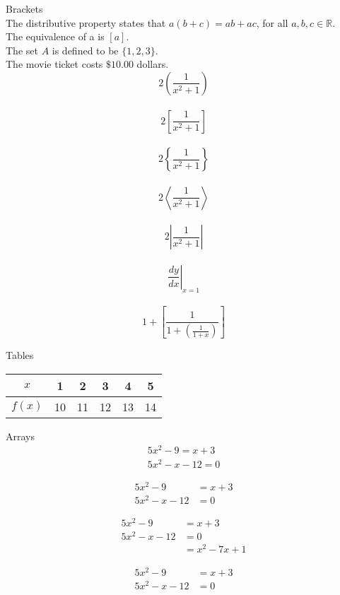 \documentclass[11pt]{article}
\begin{document}
Brackets \\[10pt]
The distributive property states that $a(b+c)=ab+ac$, 
for all $a, b, c \in \mathbb{R}$. \\[6pt]
The equivalence of a is $[a]$.\\[6pt]
The set $A$ is defined to be $\{1,2,3\}$.\\[6pt]
The movie ticket costs $\$10.00$ dollars. \\[6pt]

$$2\left(\frac{1}{x^2+1}\right)$$ \\[2pt]
$$2\left[\frac{1}{x^2+1}\right]$$ \\[2pt]
$$2\left\{\frac{1}{x^2+1}\right\}$$ \\[2pt]
$$2\left\langle  \frac{1}{x^2+1}\right\rangle  $$ \\[2pt]
$$2\left|  \frac{1}{x^2+1}\right|  $$ \\[2pt]
$$\left.\frac{dy}{dx}\right|_{x=1}$$ \\[2pt]
$$1+\left[\frac{1}{1+\left(\frac{1}{1+x}\right)}\right]$$

Tables \\[10pt]
\begin{tabular}{|c|c|c|c|c|c|}
\hline
$x$ &1 &2 &3 &4 &5 \\ \hline
$f(x)$ &10 &11 &12 &13 &14 \\ \hline
\end{tabular}

Arrays
\begin{align}
5x^2-9 = x+3\\
5x^2-x-12 = 0
\end{align}

\begin{align}
5x^2-9 &= x+3\\
5x^2-x-12 &= 0
\end{align}

\begin{align*}
5x^2-9 &= x+3\\
5x^2-x-12 &= 0\\
&= x^2-7x+1
\end{align*}

\begin{align}
5x^2-9 &= x+3\\
5x^2-x-12 &= 0
\end{align}
\end{document}
